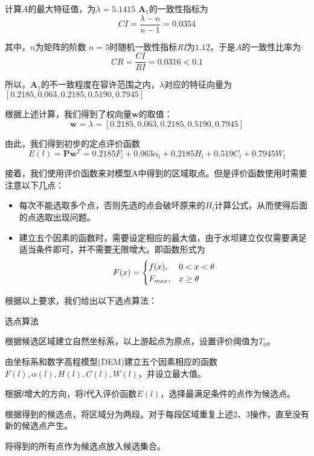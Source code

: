 \documentclass[nocover]{cumcmart}
\begin{document}
计算$A$的最大特征值，为$\lambda = 5.1415$
$\textbf{A}_1$的一致性指标为
\[\mathit{CI} = \frac{\lambda - n}{n - 1} = 0.0354\]

其中，$n$为矩阵的阶数
$n = 5$时随机一致性指标\textit{RI}为$1.12$，于是$A$的一致性比率为:
\[\mathit{CR} = \frac{\mathit{CI}}{\mathit{RI}} = 0.0316 < 0.1 \]

所以，$\textbf{A}_1$的不一致程度在容许范围之内，$\lambda$对应的特征向量为$\left[0.2185, 0.063, 0.2185, 0.5190, 0.7945\right]$

根据上述计算，我们得到了权向量$\textbf{w}$的取值：
\begin{equation}
\textbf{w} = \lambda = \left[0.2185, 0.063, 0.2185, 0.5190, 0.7945\right]
\end{equation}

由此，我们得到初步的定点评价函数
\begin{equation}
E(l) = \textbf{P}\textbf{w}^{T} = 0.2185F_l + 0.063{\alpha}_{l} + 0.2185H_l + 0.519C_l + 0.7945W_l
\end{equation}

接着，我们使用评价函数来对模型A中得到的区域取点。但是评价函数使用时需要注意以下几点：
\begin{itemize}
\item 每次不能选取多个点，否则先选的点会破坏原来的$H_l$计算公式，从而使得后面的点选取出现问题。
\item 建立五个因素的函数时，需要设定相应的最大值，由于水坝建立仅仅需要满足适当条件即可，并不需要无限增大。即函数形式为
\begin{eqnarray}
F(x) = 
\begin{cases}
f(x), & 0 < x < \theta \cr F_{max}, & x \ge \theta
\end{cases} 
\end{eqnarray}
\end{itemize}


根据以上要求，我们给出以下选点算法：
\begin{framed}
\begin{list}{.}
    {\setlength{\parsep}{0ex}\setlength{\itemsep}{0ex}}
\item[] 选点算法
\item 根据候选区域建立自然坐标系，以上游起点为原点，设置评价阈值为$T_{0}$。
\item 由坐标系和数字高程模型(DEM)建立五个因素相应的函数$F(l),\alpha(l),H(l),C(l),W(l)$，并设立最大值。
\item 根据$l$增大的方向，将$l$代入评价函数$E(l)$，选择最满足条件的点作为候选点。
\item 根据得到的候选点，将区域分为两段。对于每段区域重复上述2、3操作，直至没有新的候选点产生。
\item 将得到的所有点作为候选点放入候选集合。
\end{list}
\end{framed}
\end{document}
